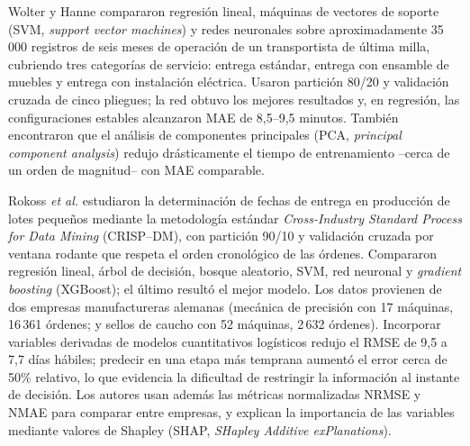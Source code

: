 \documentclass[journal]{IEEEtran}
\begin{document}
Wolter y Hanne \cite{wolter2024} compararon regresión lineal, máquinas de vectores de soporte (SVM, \textit{support vector machines}) y redes neuronales sobre aproximadamente 35\,000 registros de seis meses de operación de un transportista de última milla, cubriendo tres categorías de servicio: entrega estándar, entrega con ensamble de muebles y entrega con instalación eléctrica. Usaron partición 80/20 y validación cruzada de cinco pliegues; la red obtuvo los mejores resultados y, en regresión, las configuraciones estables alcanzaron MAE de 8,5--9,5 minutos. También encontraron que el análisis de componentes principales (PCA, \textit{principal component analysis}) redujo drásticamente el tiempo de entrenamiento --cerca de un orden de magnitud-- con MAE comparable.

Rokoss \emph{et al.} \cite{rokoss2024} estudiaron la determinación de fechas de entrega en producción de lotes pequeños mediante la metodología estándar \textit{Cross-Industry Standard Process for Data Mining} (CRISP--DM), con partición 90/10 y validación cruzada por ventana rodante que respeta el orden cronológico de las órdenes. Compararon regresión lineal, árbol de decisión, bosque aleatorio, SVM, red neuronal y \textit{gradient boosting} (XGBoost); el último resultó el mejor modelo. Los datos provienen de dos empresas manufactureras alemanas (mecánica de precisión con 17 máquinas, 16\,361 órdenes; y sellos de caucho con 52 máquinas, 2\,632 órdenes). Incorporar variables derivadas de modelos cuantitativos logísticos redujo el RMSE de 9,5 a 7,7 días hábiles; predecir en una etapa más temprana aumentó el error cerca de 50\% relativo, lo que evidencia la dificultad de restringir la información al instante de decisión. Los autores usan además las métricas normalizadas NRMSE y NMAE para comparar entre empresas, y explican la importancia de las variables mediante valores de Shapley (SHAP, \textit{SHapley Additive exPlanations}).
\end{document}
